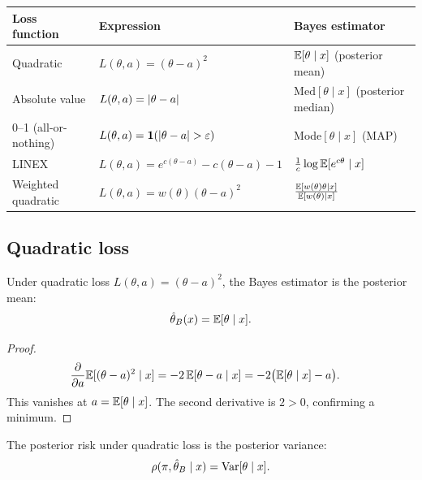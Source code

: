 \begin{keyformulas}[title=\textbf{Bayes estimators by loss function}]
\begin{center}
\renewcommand{\arraystretch}{1.5}
\begin{tabular}{p{4.5cm} p{4cm} p{5cm}}
\toprule
\textbf{Loss function} & \textbf{Expression} & \textbf{Bayes estimator} \\
\midrule
Quadratic & $L(\theta, a) = (\theta - a)^2$ &
  $\mathbb{E}[\theta \mid x]$ (posterior mean) \\
Absolute value & $L(\theta, a) = \left| \theta - a \right|$ &
  $\text{Med}[\theta \mid x]$ (posterior median) \\
0--1 (all-or-nothing) & $L(\theta, a) = \mathbf{1}(\left| \theta - a \right| > \varepsilon)$ &
  Mode$[\theta \mid x]$ (MAP) \\
LINEX & $L(\theta, a) = e^{c(\theta-a)} - c(\theta-a) - 1$ &
  $\frac{1}{c}\log \mathbb{E}[e^{c\theta} \mid x]$ \\
Weighted quadratic & $L(\theta, a) = w(\theta)(\theta - a)^2$ &
  $\frac{\mathbb{E}[w(\theta)\theta \mid x]}{\mathbb{E}[w(\theta) \mid x]}$ \\
\bottomrule
\end{tabular}
\end{center}
\end{keyformulas}

\subsection{Quadratic loss}

\begin{theorem}
\label{thm:bayes_quad}
Under quadratic loss $L(\theta, a) = (\theta - a)^2$, the Bayes
estimator is the posterior mean:
\[
  \hat{\theta}_B(x) = \mathbb{E}[\theta \mid x].
\]
\end{theorem}

\begin{proof}
\begin{align*}
  \frac{\partial}{\partial a} \mathbb{E}[(\theta - a)^2 \mid x]
  &= -2\,\mathbb{E}[\theta - a \mid x]
  = -2\big(\mathbb{E}[\theta \mid x] - a\big).
\end{align*}
This vanishes at $a = \mathbb{E}[\theta \mid x]$. The second derivative is
$2 > 0$, confirming a minimum.
\end{proof}

\begin{corollary}
The posterior risk under quadratic loss is the posterior variance:
\[
  \rho(\pi, \hat{\theta}_B \mid x) = \mathrm{Var}[\theta \mid x].
\]
\end{corollary}

